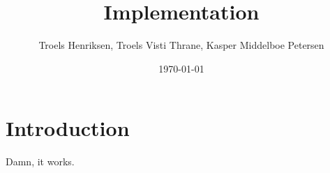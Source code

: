 \documentclass[12pt]{article}
\author{
        Troels Henriksen, Troels Visti Thrane, Kasper Middelboe Petersen
}
\date{\today}
\title{Implementation}
\begin{document}
 
\maketitle

\section{Introduction}

Damn, it works.
 
\end{document}
